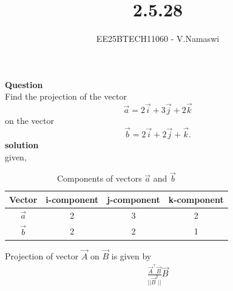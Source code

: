 \documentclass[journal]{IEEEtran}
\begin{document}

\vspace{3cm}

\title{2.5.28}
\author{EE25BTECH11060 - V.Namaswi}
{\let\newpage\relax\maketitle}

\renewcommand{\thefigure}{\theenumi}
\renewcommand{\thetable}{\theenumi}
\setlength{\intextsep}{10pt} %
\textbf{Question}\\
Find the projection of the vector 
\[
\vec{a} = 2\vec{i} + 3\vec{j} + 2\vec{k}
\]
on the vector 
\[
\vec{b} = 2\vec{i} + 2\vec{j} + \vec{k}.
\]
\textbf{solution}\\
given,
\begin{table}[h!]
\centering
\begin{tabular}{|c|c|c|c|}
\hline
\textbf{Vector} & \textbf{i-component} & \textbf{j-component} & \textbf{k-component} \\
\hline
$\vec{a}$ & 2 & 3 & 2 \\
\hline
$\vec{b}$ & 2 & 2 & 1 \\
\hline
\end{tabular}
\caption{Components of vectors $\vec{a}$ and $\vec{b}$}
\end{table}


Projection of vector $\vec{A}$  on $\vec{B}$ is given by \\
\begin{align}
\frac{\vec{A}^\top\vec{B}}{||\vec{B}^2||}\vec{B}
\end{align}
\end{document}
